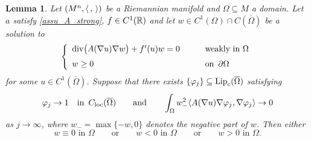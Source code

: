 \documentclass[10 pt,a4paper]{article}
\newtheorem{lemma}[definition]{Lemma}
\theoremstyle{definition}
\begin{document}
\begin{lemma} \label{Lemma_w-}
	Let $(M^n,\langle \, , \, \rangle)$ be a Riemannian manifold and $\Omega \subseteq M$ a domain. Let $a$ satisfy \eqref{assu_A_strong}, $f \in C^1(\mathbb R)$ 
	and let $w\in C^1(\Omega)\cap C(\overline{\Omega})$ be a solution to
	\begin{equation} \label{w-eq}
	\left\{
	\begin{array}{ll}
		\mathrm{div}\big( A(\nabla u) \nabla w\big) + f'(u) w = 0 & \qquad \text{weakly in } \Omega \\[0.2cm]
		w \geq 0 & \qquad \text{on } \, \partial\Omega \\
	\end{array}
	\right.
	\end{equation}
	for some $u \in C^1(\overline\Omega)$. Suppose that there exists $\{\varphi_j\} \subseteq \mathrm{Lip}_c(\overline\Omega)$ satisfying 
	\begin{equation} \label{Hgrowth}
	\varphi_j \to 1 \quad \text{in } \, C_{\mathrm{loc}}(\overline\Omega) \qquad \text{and} \qquad \int_\Omega w_-^2 \langle A(\nabla u) \nabla \varphi_j, \nabla \varphi_j \rangle \to 0
\end{equation}
as $j \to \infty$, where $w_- = \max\{-w,0\}$ denotes the negative part of $w$. Then either
	\begin{equation} \label{w-alt3}
		w\equiv 0 \text{ in } \Omega \qquad \text{or} \qquad w<0 \text{ in } \Omega \qquad \text{or} \qquad w>0 \text{ in } \Omega.
	\end{equation}
\end{lemma}
\end{document}
